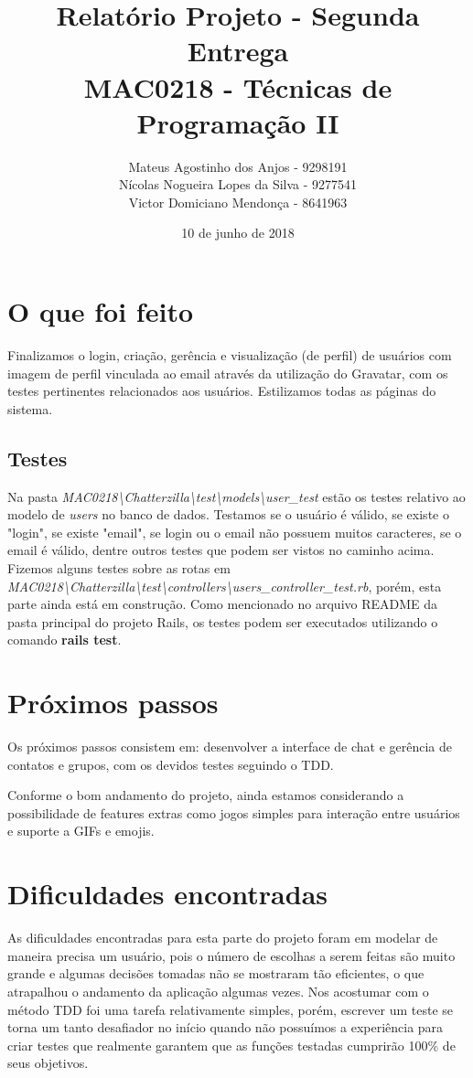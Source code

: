 \documentclass[11pt,a4paper,titlepage]{article}
\title{Relatório Projeto - Segunda Entrega \\
MAC0218 - Técnicas de Programação II}
\author{Mateus Agostinho dos Anjos - 9298191\\Nícolas Nogueira Lopes da Silva - 9277541\\Victor Domiciano Mendonça - 8641963}
\date{10 de junho de 2018}
\begin{document}
\maketitle

\section{O que foi feito}
	Finalizamos o login, criação, gerência e visualização (de perfil) de usuários com imagem de perfil vinculada ao email através da utilização do Gravatar, com os testes pertinentes relacionados aos usuários. Estilizamos todas as páginas do sistema.

\subsection{Testes}
	Na pasta \textit{MAC0218\textbackslash Chatterzilla\textbackslash test\textbackslash models\textbackslash user\_test} estão os testes relativo ao modelo de \textit{users} no banco de dados.
    Testamos se o usuário é válido, se existe o "login", se existe "email", se login ou o email não possuem muitos caracteres, se o email é válido, dentre outros testes que podem ser vistos no caminho acima.
    Fizemos alguns testes sobre as rotas em \textit{MAC0218\textbackslash Chatterzilla\textbackslash test\textbackslash controllers\textbackslash users\_controller\_test.rb}, porém, esta parte ainda está em construção. Como mencionado no arquivo README da pasta principal do projeto Rails, os testes podem ser executados utilizando o comando \textbf{rails test}.

\section{Próximos passos}

	Os próximos passos consistem em: desenvolver a interface de chat e gerência de contatos e grupos, com os devidos testes seguindo o TDD.

Conforme o bom andamento do projeto, ainda estamos considerando a possibilidade de features extras como jogos simples para interação entre usuários e suporte a GIFs e emojis.

\section{Dificuldades encontradas}

	As dificuldades encontradas para esta parte do projeto foram em modelar de maneira precisa um usuário, pois o número de escolhas a serem feitas são muito grande e algumas decisões tomadas não se mostraram tão eficientes, o que atrapalhou o andamento da aplicação algumas vezes. Nos acostumar com o método TDD foi uma tarefa relativamente simples, porém, escrever um teste se torna um tanto desafiador no início quando não possuímos a experiência para criar testes que realmente garantem que as funções testadas cumprirão 100\% de seus objetivos.
\end{document}
